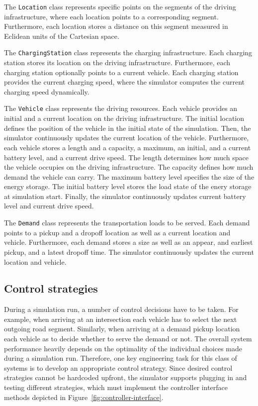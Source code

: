 \documentclass[a4paper,twoside]{article}
\begin{document}
	The \texttt{Location} class represents specific points on the segments of the driving infrastructure, where
	each location points to a corresponding segment.
	Furthermore, each location stores a distance on this segment measured in Eclidean units of the Cartesian space.
	
	The \texttt{ChargingStation} class represents the charging infrastructure.
	Each charging station stores its location on the driving infrastructure.
	Furthermore, each charging station optionally points to a current vehicle.
	Each charging station provides the current charging speed, where the simulator computes the current charging speed dynamically.
	
	The \texttt{Vehicle} class represents the driving resources.
	Each vehicle provides an initial and a current location on the driving infrastructure.
	The initial location defines the position of the vehicle in the initial state of the simulation.
	Then, the simulator continuously updates the current location of the vehicle.
	Furthermore, each vehicle stores a length and a capacity, a maximum, an initial, and a current battery level, and a current drive speed.
	The length determines how much space the vehicle occupies on the driving infrastructure.
	The capacity defines how much demand the vehicle can carry.
	The maximum battery level specifies the size of the energy storage.
	The initial battery level stores the load state of the enery storage at simulation start.
	Finally, the simulator continuously updates current battery level and current drive speed.
	
	The \texttt{Demand} class represents the transportation loads to be served.
	Each demand points to a pickup and a dropoff location as well as a current location and vehicle.
	Furthermore, each demand stores a size as well as an appear, and earliest pickup, and a latest dropoff time.
	The simulator continuously updates the current location and vehicle.
	
	\subsection{Control strategies}
	\label{sec:controller-interface}
	
	
	During a simulation run, a number of control decisions have to be taken.
	For example, when arriving at an intersection each vehicle has to select the next outgoing road segment.
	Similarly, when arriving at a demand pickup location each vehicle as to decide whether to serve the demand or not.
	The overall system performance heavily depends on the optimality of the individual choices made during a simulation run.
	Therefore, one key engineering task for this class of systems is to develop an appropriate control strategy.
	Since desired control strategies cannot be hardcoded upfront, the simulator supports plugging in and testing different strategies, which must implement the controller interface methods depicted in Figure~\ref{fig:controller-interface}.
	
\end{document}
